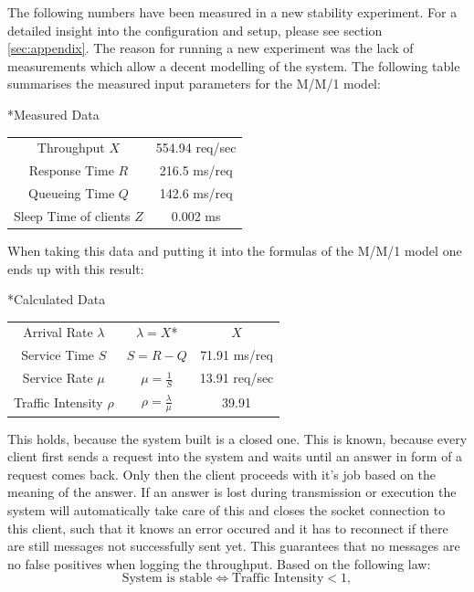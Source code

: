 \documentclass[11pt]{article}
\begin{document}
The following numbers have been measured in a new stability experiment. For a detailed insight into the configuration and setup, please see section \ref{sec:appendix}. The reason for running a new experiment was the lack of measurements which allow a decent modelling of the system. The following table summarises the measured input parameters for the M/M/1 model:
\begin{center}
	*{Measured Data} 
	\begin{tabular}{c|c}
		\hline
		Throughput $X$ & 554.94 req/sec \\
		Response Time $R$ & 216.5 ms/req \\
		Queueing Time $Q$ & 142.6 ms/req \\	
		Sleep Time of clients $Z$ & 0.002 ms \\ \hline
	\end{tabular}
\end{center}
When taking this data and putting it into the formulas of the M/M/1 model one ends up with this result:
\begin{center}
	*{Calculated Data}
	\begin{tabular}{c|c|c}
		\hline
		Arrival Rate $\lambda$ & $\lambda=X$* & $X$ \\
		Service Time $S$ & $S=R-Q$ &71.91 ms/req \\
		Service Rate $\mu$ & $\mu=\frac{1}{S}$ & 13.91 req/sec \\
		Traffic Intensity $\rho$ & $\rho=\frac{\lambda}{\mu}$ & 39.91 \\
		\hline		
	\end{tabular}
\end{center}
\footnotesize*This holds, because the system built is a closed one. This is known, because every client first sends a request into the system and waits until an answer in form of a request comes back. Only then the client proceeds with it's job based on the meaning of the answer. If an answer is lost during transmission or execution the system will automatically take care of this and closes the socket connection to this client, such that it knows an error occured and it has to reconnect if there are still messages not successfully sent yet. This guarantees that no messages are no false positives when logging the throughput.
\normalsize
\newline\newline
Based on the following law:
\begin{equation}
	\text{System is stable}\Leftrightarrow \text{Traffic Intensity} < 1,
\end{equation}
\end{document}
